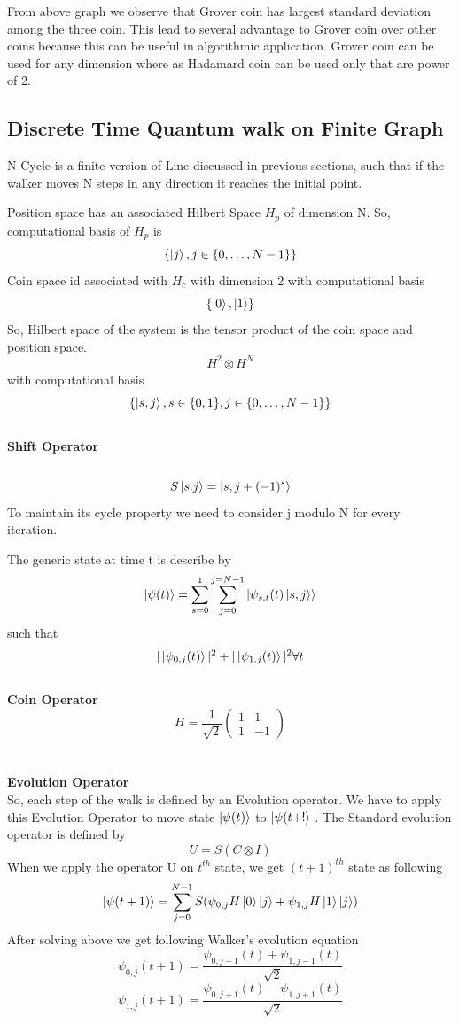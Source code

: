 \documentclass[11 pt]{article}
\theoremstyle{definition}
\theoremstyle{remark}
\newcommand{\tens}[1]{
  \mathbin{\mathop{\otimes}\limits_{#1}}}
\begin{document}
From above graph we observe that Grover coin has largest standard deviation among the three coin. This lead to several advantage to Grover coin over other coins because this can be useful in algorithmic application. Grover coin can be used for any dimension where as Hadamard coin can be used only that are power of 2.

\subsection{Discrete Time Quantum walk on Finite Graph}
N-Cycle is a finite version of Line discussed in previous sections, such that if the walker moves N steps in any direction it reaches the initial point.

Position space has an associated Hilbert Space $H_p$ of dimension N. So, computational basis of $H_p$ is
$$\{\ket{j}, j\in \{0,\hdots, N-1\}\}$$
Coin space id associated with $H_c$ with dimension 2 with computational basis
$$\{\ket{0},\ket{1}\}$$
So, Hilbert space of the system is the tensor product of the coin space and position space.$$H^2\tens{}H^N$$
with computational basis $$\{\ket{s,j}, s\in\{0,1\}, j\in \{0,\hdots, N-1\}\}$$
\\
\textbf{Shift Operator}\\
\\
$$ S\ket{s.j} = \ket{s,j+(-1)^s}$$
To maintain its cycle property we need to consider j modulo N for every iteration.

The generic state at time t is describe by
$$\ket{\psi(t)} = \sum_{s=0}^{1}\sum_{j=0}^{j=N-1}\ket{\psi_{s,t}(t)\ket{s,j}}$$
such that
$$|\ket{\psi_{0,j}(t)}|^2 + |\ket{\psi_{1,j}(t)}|^2 \space \forall t$$
\\
\textbf{Coin Operator}
$$H  = \dfrac{1}{\sqrt{2}}\begin{pmatrix}
           1 & 1\\
           1 & -1
\end{pmatrix}$$
\\
\\
\textbf{Evolution Operator}\\
So, each step of the walk is defined by an Evolution operator. We have to apply this Evolution Operator to move state $\ket{\psi(t)}$ to $\ket{\psi(t+!}$ . The Standard evolution operator is defined by 
$$U = S(C\tens{}I)$$
When we apply the operator U on $t^{th}$ state, we get $(t+1)^{th}$ state as following
$$\ket{\psi(t+1)} = \sum_{j=0}^{N-1}S(\psi_{0,j}H\ket{0}\ket{j}+\psi_{1,j}H\ket{1}\ket{j})$$
After solving above we get following Walker's evolution equation
$$\psi_{0,j}(t+1) = \dfrac{\psi_{0,j-1}(t) + \psi_{1,j-1}(t)}{\sqrt{2}}$$
    $$\psi_{1,j}(t+1) = \dfrac{\psi_{0,j+1}(t) - \psi_{1,j+1}(t)}{\sqrt{2}}$$
\end{document}

